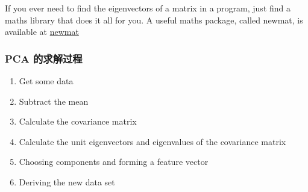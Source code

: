 \documentclass{article}
\begin{document}
If you ever need to find the eigenvectors of a matrix in a program, just find a maths library that does it all for you.  A useful maths package, called newmat, is available at \href{http://webnz.com/robert/}{newmat}

\subsubsection{PCA 的求解过程}
\begin{enumerate}
\item Get some data
\item Subtract the mean
\item Calculate the covariance matrix
\item Calculate the unit eigenvectors and eigenvalues of the covariance matrix
\item Choosing components and forming a feature vector
\item Deriving the new data set
\end{enumerate}
\end{document}
